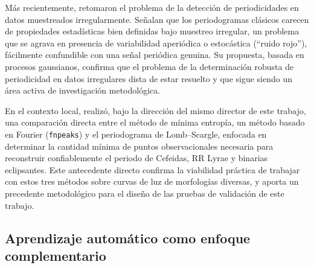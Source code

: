 \documentclass[12pt,letterpaper,oneside]{book}
\begin{document}
M\'as recientemente, \citet{gurpide_2025} retomaron el problema de la detecci\'on de periodicidades en datos muestreados irregularmente. Se\~nalan que los periodogramas cl\'asicos carecen de propiedades estad\'isticas bien definidas bajo muestreo irregular, un problema que se agrava en presencia de variabilidad aperi\'odica o estoc\'astica (``ruido rojo''), f\'acilmente confundible con una se\~nal peri\'odica genuina. Su propuesta, basada en procesos gaussianos, confirma que el problema de la determinaci\'on robusta de periodicidad en datos irregulares dista de estar resuelto y que sigue siendo un \'area activa de investigaci\'on metodol\'ogica.

En el contexto local, \citet{Cubillos2021} realiz\'o, bajo la direcci\'on del mismo director de este trabajo, una comparaci\'on directa entre el m\'etodo de m\'inima entrop\'ia, un m\'etodo basado en Fourier (\texttt{fnpeaks}) y el periodograma de Lomb--Scargle, enfocada en determinar la cantidad m\'inima de puntos observacionales necesaria para reconstruir confiablemente el periodo de Cefeidas, RR Lyrae y binarias eclipsantes. Este antecedente directo confirma la viabilidad pr\'actica de trabajar con estos tres m\'etodos sobre curvas de luz de morfolog\'ias diversas, y aporta un precedente metodol\'ogico para el dise\~no de las pruebas de validaci\'on de este trabajo.

\subsection{Aprendizaje autom\'atico como enfoque complementario}
\end{document}
